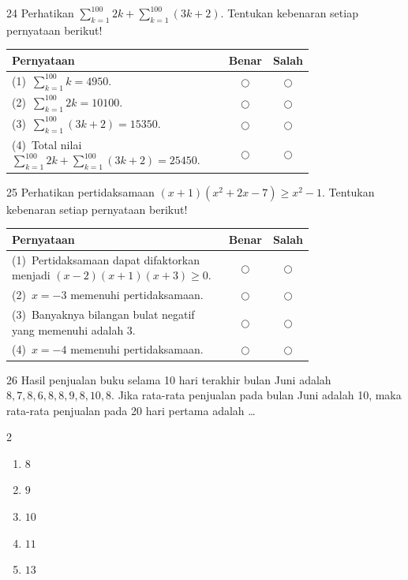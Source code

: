 \documentclass[11pt]{article}
\newenvironment{pilB}{%
  \par\smallskip\begin{multicols}{2}
  \begin{enumerate}[label=(\Alph*),leftmargin=*,itemsep=1pt,topsep=3pt]}%
  {\end{enumerate}\end{multicols}}
\begin{document}
\begin{soal}{24}
Perhatikan $\displaystyle\sum_{k=1}^{100}2k+\sum_{k=1}^{100}(3k+2)$.
Tentukan kebenaran setiap pernyataan berikut!

\par\smallskip
{\renewcommand{\arraystretch}{1.4}%
\begin{tabular}{@{}p{0.76\linewidth}cc@{}}
\hline
\textbf{Pernyataan} & \textbf{Benar} & \textbf{Salah}\\
\hline
(1)~$\displaystyle\sum_{k=1}^{100} k = 4950$.
  & $\bigcirc$ & $\bigcirc$\\
(2)~$\displaystyle\sum_{k=1}^{100} 2k = 10100$.
  & $\bigcirc$ & $\bigcirc$\\
(3)~$\displaystyle\sum_{k=1}^{100} (3k+2) = 15350$.
  & $\bigcirc$ & $\bigcirc$\\
(4)~Total nilai $\displaystyle\sum_{k=1}^{100}2k+\sum_{k=1}^{100}(3k+2) = 25450$.
  & $\bigcirc$ & $\bigcirc$\\
\hline
\end{tabular}}
\end{soal}

\begin{soal}{25}
Perhatikan pertidaksamaan $(x+1)(x^2+2x-7)\geq x^2-1$.
Tentukan kebenaran setiap pernyataan berikut!

\par\smallskip
{\renewcommand{\arraystretch}{1.4}%
\begin{tabular}{@{}p{0.76\linewidth}cc@{}}
\hline
\textbf{Pernyataan} & \textbf{Benar} & \textbf{Salah}\\
\hline
(1)~Pertidaksamaan dapat difaktorkan menjadi $(x-2)(x+1)(x+3)\geq0$.
  & $\bigcirc$ & $\bigcirc$\\
(2)~$x=-3$ memenuhi pertidaksamaan.
  & $\bigcirc$ & $\bigcirc$\\
(3)~Banyaknya bilangan bulat negatif yang memenuhi adalah $3$.
  & $\bigcirc$ & $\bigcirc$\\
(4)~$x=-4$ memenuhi pertidaksamaan.
  & $\bigcirc$ & $\bigcirc$\\
\hline
\end{tabular}}
\end{soal}

\begin{soal}{26}
Hasil penjualan buku selama 10 hari terakhir bulan Juni adalah
$8,7,8,6,8,8,9,8,10,8$. Jika rata-rata penjualan pada bulan Juni
adalah 10, maka rata-rata penjualan pada 20 hari pertama adalah \ldots
\begin{pilB}
  \item $8$ \item $9$ \item $10$ \item $11$ \item $13$
\end{pilB}
\end{soal}
\end{document}
